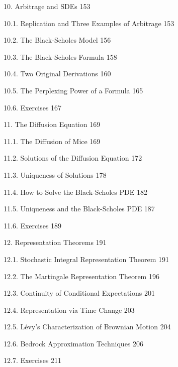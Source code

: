 10. Arbitrage and SDEs 153



10.1. Replication and Three Examples of Arbitrage 153



10.2. The Black-Scholes Model 156



10.3. The Black-Scholes Formula 158



10.4. Two Original Derivations 160



10.5. The Perplexing Power of a Formula 165



10.6. Exercises 167 



11. The Diffusion Equation 169



11.1. The Diffusion of Mice 169



11.2. Solutions of the Diffusion Equation 172



11.3. Uniqueness of Solutions 178



11.4. How to Solve the Black-Scholes PDE 182



11.5. Uniqueness and the Black-Scholes PDE 187



11.6. Exercises 189



12. Representation Theorems 191



12.1. Stochastic Integral Representation Theorem 191



12.2. The Martingale Representation Theorem 196



12.3. Continuity of Conditional Expectations 201



12.4. Representation via Time Change 203



12.5. Lévy's Characterization of Brownian Motion 204



12.6. Bedrock Approximation Techniques 206



12.7. Exercises 211



